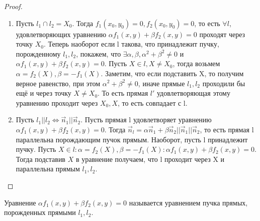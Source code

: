 \begin{proof}
	\begin{enumerate}
		\item Пусть \(l_1 \cap l_2 = X_0\). Тогда \(f_1(x_0,y_0) = 0, f_2(x_0, y_0) = 0\), то есть $\forall l$, удовлетворяющих уравнению \(\alpha f_1(x,y)+\beta f_2(x,y) = 0\) проходят через точку \(X_0\). \newline
		Теперь наоборот если l такова, что принадлежит пучку, порожденному \(l_1, l_2\), покажем, что \(\exists \alpha, \beta, \alpha^2+\beta^2\ne 0\) и \(\alpha f_1(x,y)+\beta f_2(x,y) = 0\). Пусть \(X \in l, X\ne X_0\), тогда возьмем \(\alpha = f_2(X), \beta = -f_1(X)\). Заметим, что если подставить X, то получим верное равенство, при этом \(\alpha^2+\beta^2\ne0\), иначе прямые \(l_1, l_2\) проходили бы ещё и через точку \(X\ne X_0\). То есть прямая \(l'\) удовлетворяющая этому уравнению проходит через \(X_0, X\), то есть совпадает с l.
		\item Пусть \(l_1 || l_2\Longleftrightarrow \vec n_1 || \vec n_2\). Пусть прямая l удовлетворяет уравнению \(\alpha f_1(x,y)+\beta f_2(x,y) = 0.\) Тогда \(\vec n_l = \alpha\vec n_1 + \beta\vec n_2 || \vec n_1 || \vec n_2\), то есть прямая l параллельна порождающим пучок прямым. \newline
		Наоборот, пусть l принадлежит пучку. Пусть \(X\in l:\alpha = f_2(X), \beta = -f_1(X): \alpha f_1(x,y)+\beta f_2(x,y) = 0\). Тогда подставив \(X\) в уравнение получаем, что l проходит через X и параллельна прямым \(l_1, l_2\). 
	\end{enumerate}
\end{proof}
\begin{note}
	Уравнение \(\alpha f_1(x,y)+\beta f_2(x,y) = 0\) называется уравнением пучка прямых, порожденных прямыми \(l_1, l_2\).
\end{note}
